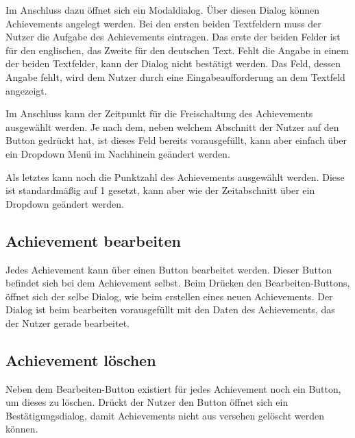 \documentclass[11pt]{article}
\begin{document}


Im Anschluss dazu öffnet sich ein Modaldialog.
Über diesen Dialog können Achievements angelegt werden.
Bei den ersten beiden Textfeldern muss der Nutzer die Aufgabe des Achievements eintragen.
Das erste der beiden Felder ist für den englischen, das Zweite für den deutschen Text.
Fehlt die Angabe in einem der beiden Textfelder, kann der Dialog nicht bestätigt werden.
Das Feld, dessen Angabe fehlt, wird dem Nutzer durch eine Eingabeaufforderung an dem Textfeld angezeigt.

Im Anschluss kann der Zeitpunkt für die Freischaltung des Achievements ausgewählt werden.
Je nach dem, neben welchem Abschnitt der Nutzer auf den Button gedrückt hat, ist dieses Feld bereits
vorausgefüllt, kann aber einfach über ein Dropdown Menü im Nachhinein geändert werden.


Als letztes kann noch die Punktzahl des Achievements ausgewählt werden. Diese ist standardmäßig auf 1
gesetzt, kann aber wie der Zeitabschnitt über ein Dropdown geändert werden.


\subsection{Achievement bearbeiten}
Jedes Achievement kann über einen Button bearbeitet werden.
Dieser Button befindet sich bei dem Achievement selbst.
Beim Drücken den Bearbeiten-Buttons, öffnet sich der selbe Dialog, wie beim erstellen eines neuen
Achievements. Der Dialog ist beim bearbeiten vorausgefüllt mit den Daten des Achievements, das der Nutzer gerade
bearbeitet.

\subsection{Achievement löschen}
Neben dem Bearbeiten-Button existiert für jedes Achievement noch ein Button, um dieses zu löschen.
Drückt der Nutzer den Button öffnet sich ein Bestätigungsdialog, damit Achievements nicht aus versehen
gelöscht werden können.
\end{document}
